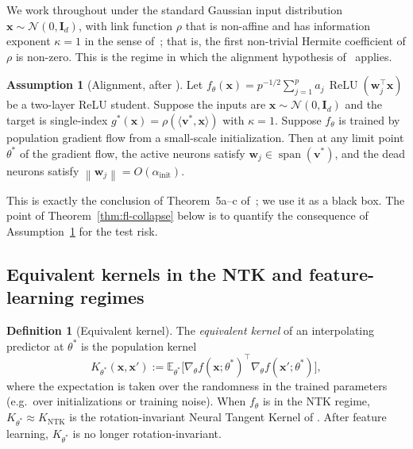 \documentclass[12pt]{amsart}
\theoremstyle{definition}
\newtheorem{definition}[theorem]{Definition}
\newtheorem{assumption}[theorem]{Assumption}
\theoremstyle{remark}
\DeclareMathOperator{\relu}{ReLU}
\DeclareMathOperator{\spn}{span}
\newcommand{\E}{\mathbb{E}}
\newcommand{\bx}{\mathbf{x}}
\newcommand{\bI}{\mathbf{I}}
\newcommand{\bv}{\mathbf{v}}
\newcommand{\bw}{\mathbf{w}}
\newcommand{\norm}[1]{\left\lVert #1 \right\rVert}
\begin{document}
We work throughout under the standard Gaussian input distribution
$\bx \sim \mathcal{N}(0, \bI_{d})$, with link function $\rho$ that is
non-affine and has information exponent $\kappa = 1$ in the sense
of~\cite{BenArous2021}; that is, the first non-trivial Hermite coefficient
of $\rho$ is non-zero. This is the regime in which the alignment
hypothesis of~\cite{paperB} applies.

\begin{assumption}[Alignment, after \cite{paperB}]\label{ass:alignment}
Let $f_{\theta}(\bx) = p^{-1/2} \sum_{j=1}^{p} a_{j}\, \relu(\bw_{j}^{\top}\bx)$
be a two-layer ReLU student. Suppose the inputs are
$\bx \sim \mathcal{N}(0,\bI_{d})$ and the target is single-index
$g^{*}(\bx) = \rho(\langle \bv^{*}, \bx\rangle)$ with $\kappa = 1$. Suppose
$f_{\theta}$ is trained by population gradient flow from a small-scale
initialization. Then at any limit point $\theta^{*}$ of the gradient flow,
the active neurons satisfy $\bw_{j} \in \spn(\bv^{*})$, and the dead
neurons satisfy $\norm{\bw_{j}} = O(\alpha_{\mathrm{init}})$.
\end{assumption}

This is exactly the conclusion of Theorem~5a--c of~\cite{paperB}; we use it
as a black box. The point of Theorem~\ref{thm:fl-collapse} below is to
quantify the consequence of Assumption~\ref{ass:alignment} for the test
risk.

\subsection{Equivalent kernels in the NTK and feature-learning regimes}

\begin{definition}[Equivalent kernel]\label{def:eq-kernel}
The \emph{equivalent kernel} of an interpolating predictor at $\theta^{*}$
is the population kernel
\[
  K_{\theta^{*}}(\bx, \bx') := \E_{\theta^{*}}\bigl[
    \nabla_{\theta} f(\bx; \theta^{*})^{\top}
    \nabla_{\theta} f(\bx'; \theta^{*}) \bigr],
\]
where the expectation is taken over the randomness in the trained
parameters (e.g.\ over initializations or training noise). When
$f_{\theta}$ is in the NTK regime, $K_{\theta^{*}} \approx K_{\mathrm{NTK}}$
is the rotation-invariant Neural Tangent Kernel of \cite{JGH2018}. After
feature learning, $K_{\theta^{*}}$ is no longer rotation-invariant.
\end{definition}
\end{document}
